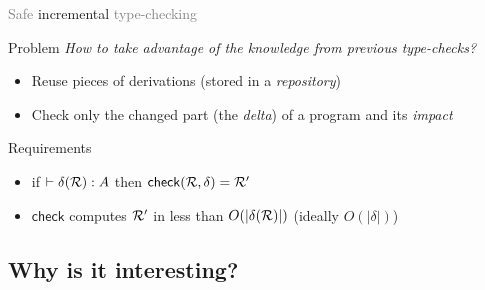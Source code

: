 \documentclass{beamer}
\theoremstyle{example}
\begin{document}
\begin{frame}{\textcolor{gray}{Safe} incremental
    \textcolor{gray}{type-checking}}

    \begin{block}{Problem}
      \emph{How to take advantage of the knowledge from previous type-checks?}
      \begin{itemize}
      \item Reuse pieces of derivations (stored in a \emph{repository})
      \item Check only the changed part (the \emph{delta}) of a
        program and its \emph{impact}
      \end{itemize}

        \centering
    \end{block}
    \pause

    \begin{block}{Requirements}
      \begin{itemize}
      \item if $\vdash \delta(\mathcal{R}) : A$ then ${\rm\mathsf{check}}({\mathcal{R},
          \delta}) = \mathcal{R'}$
      \item $\mathsf{check}$ computes $\mathcal{R'}$ in less than $O(|\delta(\mathcal{R})|)$ \small\qquad (ideally
        $O(|\delta|)$)
      \end{itemize}
    \end{block}

\end{frame}

\subsection{Why is it interesting?}

\newcommand{\cfbox}[2]{%
    \colorlet{currentcolor}{.}%
    {\color{#1}%
    \fbox{\color{currentcolor}#2}}%
}
\end{document}
